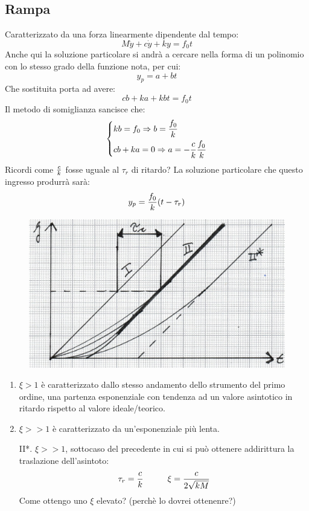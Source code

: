 \documentclass[a4paper, 15pt]{article}
\begin{document}
\subsection{Rampa} 	
\begin{adjustwidth}{2in}{}	
	Caratterizzato da una forza linearmente dipendente dal tempo:
	\[ M\ddot{y} + c\dot{y} + ky =f_0t\]
	Anche qui la soluzione particolare si andrà a cercare nella forma di un polinomio con lo stesso grado della funzione nota, per cui:
	\[ y_p = a + bt\]
	Che sostituita porta ad avere:
	\[ cb + ka + kbt = f_0t\]
	Il metodo di somiglianza sancisce che: 
	\[ \begin{dcases}
		kb = f_0 \Rightarrow b = {f_0\over k} \\
		cb + ka = 0 \Rightarrow a = -{c\over k}{f_0\over k}
	\end{dcases}\]
	Ricordi come ${c\over k}$ fosse uguale al $\tau_r$ di ritardo? \newline 
\newpage	
	La soluzione particolare che questo ingresso produrrà sarà: 
	\[ y_p = {f_0\over k}(t-\tau_r)\]
\begin{figure}
	\centering
	\includegraphics[width=0.5\linewidth]{fig/mm14}
	\label{fig:mm14}
\end{figure}
\begin{enumerate}[label=\Roman*.]
		\item \(\xi > 1\) è caratterizzato dallo stesso andamento dello strumento del primo ordine, una partenza esponenziale con tendenza ad un valore asintotico in ritardo rispetto al valore ideale/teorico. 
		\item \(\xi >> 1\) è caratterizzato da un'esponenziale più lenta. 
		\item[II*.] \(\xi >> 1\), sottocaso del precedente in cui si può ottenere addirittura la traslazione dell'asintoto: 
		\[\tau_r = {c\over k} \hspace{1cm} \xi = \dfrac{c}{2\sqrt{kM}}\]
		Come ottengo uno $\xi$ elevato? (perchè lo dovrei ottenenre?)
		

\end{enumerate}
\end{adjustwidth}
\end{document}
